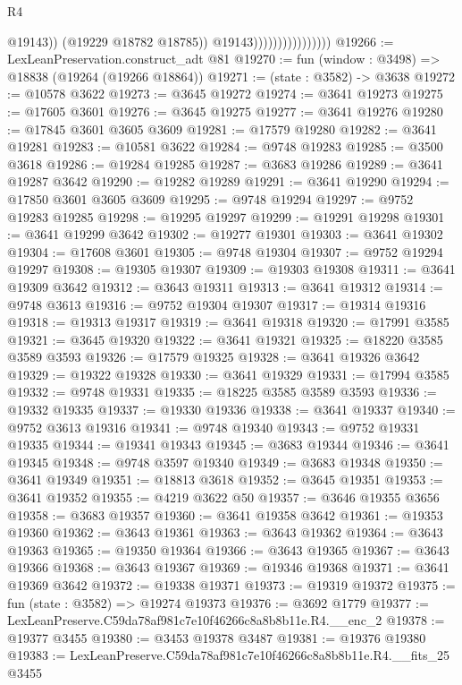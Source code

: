 \begin{lexlean}{R4}
\begin{coremodule}
                                          @19143))
                                      (@19229 @18782 @18785))
                                    @19143))))))))))))))))
@19266 := LexLeanPreservation.construct_adt @81
@19270 := fun (window : @3498) => @18838 (@19264 (@19266 @18864))
@19271 := (state : @3582) -> @3638
@19272 := @10578 @3622
@19273 := @3645 @19272
@19274 := @3641 @19273
@19275 := @17605 @3601
@19276 := @3645 @19275
@19277 := @3641 @19276
@19280 := @17845 @3601 @3605 @3609
@19281 := @17579 @19280
@19282 := @3641 @19281
@19283 := @10581 @3622
@19284 := @9748 @19283
@19285 := @3500 @3618
@19286 := @19284 @19285
@19287 := @3683 @19286
@19289 := @3641 @19287 @3642
@19290 := @19282 @19289
@19291 := @3641 @19290
@19294 := @17850 @3601 @3605 @3609
@19295 := @9748 @19294
@19297 := @9752 @19283 @19285
@19298 := @19295 @19297
@19299 := @19291 @19298
@19301 := @3641 @19299 @3642
@19302 := @19277 @19301
@19303 := @3641 @19302
@19304 := @17608 @3601
@19305 := @9748 @19304
@19307 := @9752 @19294 @19297
@19308 := @19305 @19307
@19309 := @19303 @19308
@19311 := @3641 @19309 @3642
@19312 := @3643 @19311
@19313 := @3641 @19312
@19314 := @9748 @3613
@19316 := @9752 @19304 @19307
@19317 := @19314 @19316
@19318 := @19313 @19317
@19319 := @3641 @19318
@19320 := @17991 @3585
@19321 := @3645 @19320
@19322 := @3641 @19321
@19325 := @18220 @3585 @3589 @3593
@19326 := @17579 @19325
@19328 := @3641 @19326 @3642
@19329 := @19322 @19328
@19330 := @3641 @19329
@19331 := @17994 @3585
@19332 := @9748 @19331
@19335 := @18225 @3585 @3589 @3593
@19336 := @19332 @19335
@19337 := @19330 @19336
@19338 := @3641 @19337
@19340 := @9752 @3613 @19316
@19341 := @9748 @19340
@19343 := @9752 @19331 @19335
@19344 := @19341 @19343
@19345 := @3683 @19344
@19346 := @3641 @19345
@19348 := @9748 @3597 @19340
@19349 := @3683 @19348
@19350 := @3641 @19349
@19351 := @18813 @3618
@19352 := @3645 @19351
@19353 := @3641 @19352
@19355 := @4219 @3622 @50
@19357 := @3646 @19355 @3656
@19358 := @3683 @19357
@19360 := @3641 @19358 @3642
@19361 := @19353 @19360
@19362 := @3643 @19361
@19363 := @3643 @19362
@19364 := @3643 @19363
@19365 := @19350 @19364
@19366 := @3643 @19365
@19367 := @3643 @19366
@19368 := @3643 @19367
@19369 := @19346 @19368
@19371 := @3641 @19369 @3642
@19372 := @19338 @19371
@19373 := @19319 @19372
@19375 := fun (state : @3582) => @19274 @19373
@19376 := @3692 @1779
@19377 := LexLeanPreserve.C59da78af981c7e10f46266c8a8b8b11e.R4.__enc_2
@19378 := @19377 @3455
@19380 := @3453 @19378 @3487
@19381 := @19376 @19380
@19383 := LexLeanPreserve.C59da78af981c7e10f46266c8a8b8b11e.R4.__fits_25 @3455

\end{coremodule}
\end{lexlean}
